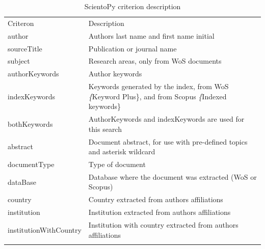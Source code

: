 \documentclass[10pt,letterpaper]{article}
\begin{document}
\begin{table}[h]
	\centering
	\caption{ScientoPy criterion description}
	\label{table_criterion}
	
	
	\begin{tabular}{ p{4cm} p{10cm}}
	\hline\noalign{\smallskip}
	Criteron       & Description                             \\
	\noalign{\smallskip}\hline\noalign{\smallskip}                                                                         
	author        & Authors last name and first name initial                                                                       \\
	sourceTitle    & Publication or journal name                                                                                    \\
	subject        & Research areas, only from WoS documents                                                                        \\
	authorKeywords & Author keywords                                                                                                \\
	indexKeywords  & Keywords generated by the index, from WoS \textit\{Keyword Plus\}, and from Scopus \textit\{Indexed keywords\} \\
	bothKeywords   & AuthorKeywords and indexKeywords are used for this search                                                      \\
	abstract       & Document abstract, for use with pre-defined topics and asterisk wildcard\\
	documentType   & Type of document                                                                                               \\
	dataBase       & Database where the document was extracted (WoS or Scopus)                                                      \\
	country        & Country extracted from authors affiliations                                                                    \\
	institution    & Institution extracted from authors affiliations                                                                \\
	institutionWithCountry    & Institution with country extracted from authors affiliations                                        \\
	\noalign{\smallskip}\hline
	\end{tabular}
	
\end{table}
\end{document}
